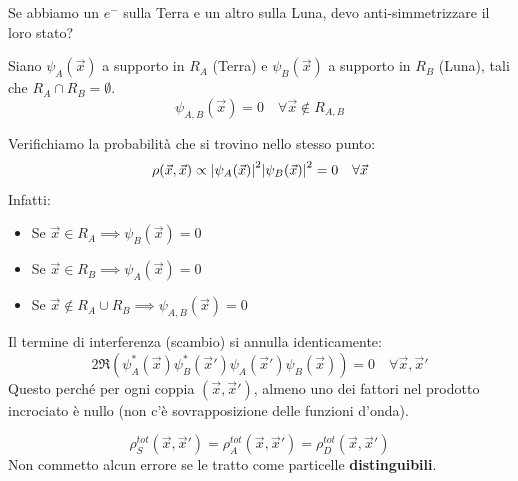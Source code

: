 \begin{example}
    Se abbiamo un \(e^-\) sulla Terra e un altro sulla Luna, devo anti-simmetrizzare il loro stato?

Siano \(\psi_A(\vec{x})\) a supporto in \(R_A\) (Terra) e \(\psi_B(\vec{x})\) a supporto in \(R_B\) (Luna), tali che \(R_A \cap R_B = \emptyset\).
\[
    \psi_{A,B}(\vec{x}) = 0 \quad \forall \vec{x} \notin R_{A,B}
\]

Verifichiamo la probabilità che si trovino nello stesso punto:
\[
    \rho(\vec{x}, \vec{x}) \propto \abs{\psi_A(\vec{x})}^2 \abs{\psi_B(\vec{x})}^2 = 0 \quad \forall \vec{x}
\]
Infatti:
\begin{itemize}
    \item Se \(\vec{x} \in R_A \implies \psi_B(\vec{x}) = 0\)
    \item Se \(\vec{x} \in R_B \implies \psi_A(\vec{x}) = 0\)
    \item Se \(\vec{x} \notin R_A \cup R_B \implies \psi_{A,B}(\vec{x}) = 0\)
\end{itemize}

Il termine di interferenza (scambio) si annulla identicamente:
\[
    2\Re \left( \psi_A^*(\vec{x})\psi_B^*(\vec{x}') \psi_A(\vec{x}')\psi_B(\vec{x}) \right) = 0 \quad \forall \vec{x}, \vec{x}'
\]
Questo perché per ogni coppia \((\vec{x}, \vec{x}')\), almeno uno dei fattori nel prodotto incrociato è nullo (non c'è sovrapposizione delle funzioni d'onda).

\[
    \rho_S^{tot}(\vec{x}, \vec{x}') = \rho_A^{tot}(\vec{x}, \vec{x}') = \rho_D^{tot}(\vec{x}, \vec{x}')
\]
Non commetto alcun errore se le tratto come particelle \textbf{distinguibili}.
\end{example}

